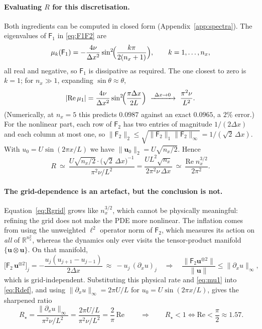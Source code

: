 \documentclass[11pt,a4paper]{article}
\theoremstyle{plain}
\theoremstyle{definition}
\theoremstyle{remark}
\newcommand{\R}{\mathbb{R}}
\newcommand{\Rey}{\mathrm{Re}}
\newcommand{\norm}[1]{\lVert #1 \rVert}
\newcommand{\abs}[1]{\lvert #1 \rvert}
\newcommand{\uvec}{\bm{u}}
\newcommand{\Fone}{\mathsf{F}_1}
\newcommand{\Ftwo}{\mathsf{F}_2}
\begin{document}
\paragraph{Evaluating $R$ for this discretisation.}  Both ingredients can be
computed in closed form (Appendix~\ref{app:spectra}).  The eigenvalues of
$\Fone$ in \eqref{eq:F1F2} are
\begin{equation}
\mu_k(\Fone)=-\frac{4\nu}{\Delta x^{2}}\sin^{2}\!\Bigl(\frac{k\pi}{2(n_x+1)}\Bigr),
\qquad k=1,\dots,n_x,
\label{eq:F1spec}
\end{equation}
all real and negative, so $\Fone$ is dissipative as required.  The one closest
to zero is $k=1$; for $n_x\gg1$, expanding $\sin\theta\approx\theta$,
\begin{equation}
\abs{\mathrm{Re}\,\mu_1}
=\frac{4\nu}{\Delta x^{2}}\sin^{2}\!\Bigl(\frac{\pi\Delta x}{2L}\Bigr)
\ \xrightarrow{\ \Delta x\to0\ }\ \frac{\pi^{2}\nu}{L^{2}} .
\label{eq:mu1}
\end{equation}
(Numerically, at $n_x=5$ this predicts $0.0987$ against an exact $0.0965$, a
$2\%$ error.)  For the nonlinear part, each row of $\Ftwo$ has two entries of
magnitude $1/(2\Delta x)$ and each column at most one, so
$\norm{\Ftwo}_2\le\sqrt{\norm{\Ftwo}_1\norm{\Ftwo}_\infty}=1/(\sqrt2\,\Delta x)$.
With $u_0=U\sin(2\pi x/L)$ we have $\norm{\uvec_0}_2=U\sqrt{n_x/2}$.  Hence
\begin{equation}
R\ \simeq\ \frac{U\sqrt{n_x/2}\cdot\bigl(\sqrt2\,\Delta x\bigr)^{-1}}
{\pi^{2}\nu/L^{2}}
=\frac{U L^{2}\sqrt{n_x}}{2\pi^{2}\nu\,\Delta x}
\ \simeq\ \frac{\Rey\; n_x^{3/2}}{2\pi^{2}} .
\label{eq:Rgrid}
\end{equation}

\paragraph{The grid-dependence is an artefact, but the conclusion is not.}
Equation~\eqref{eq:Rgrid} grows like $n_x^{3/2}$, which cannot be physically
meaningful: refining the grid does not make the PDE more nonlinear.  The
inflation comes from using the unweighted $\ell^2$ operator norm of $\Ftwo$,
which measures its action on \emph{all} of $\R^{n_x^2}$, whereas the dynamics
only ever visits the tensor-product manifold $\{\uvec\otimes\uvec\}$.  On that
manifold,
\begin{equation}
\bigl[\Ftwo\,\uvec^{\otimes2}\bigr]_j
=-\frac{u_j(u_{j+1}-u_{j-1})}{2\Delta x}\ \approx\ -u_j\,(\partial_xu)_j
\quad\Longrightarrow\quad
\frac{\norm{\Ftwo\uvec^{\otimes2}}}{\norm{\uvec}}\le\norm{\partial_xu}_\infty,
\end{equation}
which is grid-independent.  Substituting this physical rate and \eqref{eq:mu1}
into \eqref{eq:Rdef}, and using $\norm{\partial_xu}_\infty=2\pi U/L$ for
$u_0=U\sin(2\pi x/L)$, gives the sharpened ratio
\begin{equation}
\boxed{\ R_\star=\frac{\norm{\partial_xu}_\infty}{\pi^2\nu/L^2}
=\frac{2\pi U/L}{\pi^{2}\nu/L^{2}}=\frac{2}{\pi}\,\Rey\ }
\qquad\Longrightarrow\qquad
R_\star<1\iff\Rey<\frac{\pi}{2}\approx1.57 .
\label{eq:Rstar}
\end{equation}
\end{document}
